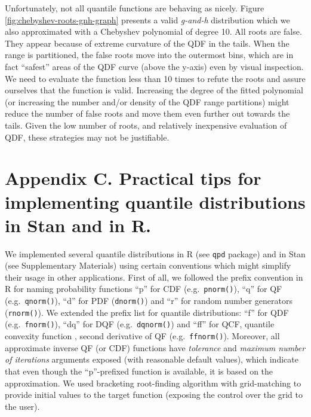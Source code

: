 \documentclass[ba]{imsart}
\numberwithin{equation}{section}
\theoremstyle{plain}
\begin{document}
Unfortunately, not all quantile functions are behaving as nicely. Figure \ref{fig:chebyshev-roots-gnh-graph} presents a valid \emph{g-and-h} distribution which we also approximated with a Chebyshev polynomial of degree 10. All roots are false. They appear because of extreme curvature of the QDF in the tails. When the range is partitioned, the false roots move into the outermost bins, which are in fact ``safest'' areas of the QDF curve (above the y-axis) even by visual inspection. We need to evaluate the function less than 10 times to refute the roots and assure ourselves that the function is valid. Increasing the degree of the fitted polynomial (or increasing the number and/or density of the QDF range partitions) might reduce the number of false roots and move them even further out towards the tails. Given the low number of roots, and relatively inexpensive evaluation of QDF, these strategies may not be justifiable.

\hypertarget{appendix-c.-practical-tips-for-implementing-quantile-distributions-in-stan-and-in-r.}{%
\section*{Appendix C. Practical tips for implementing quantile distributions in Stan and in R.}\label{appendix-c.-practical-tips-for-implementing-quantile-distributions-in-stan-and-in-r.}}

We implemented several quantile distributions in R (see \texttt{qpd} package) and in Stan (see Supplementary Materials) using certain conventions which might simplify their usage in other applications. First of all, we followed the prefix convention in R for naming probability functions ``p'' for CDF (e.g.~\texttt{pnorm()}), ``q'' for QF (e.g.~\texttt{qnorm()}), ``d'' for PDF (\texttt{dnorm()}) and ``r'' for random number generators (\texttt{rnorm()}). We extended the prefix list for quantile distributions: ``f'' for QDF (e.g.~\texttt{fnorm()}), ``dq'' for DQF (e.g.~\texttt{dqnorm()}) and ``ff'' for QCF, quantile convexity function , second derivative of QF (e.g.~\texttt{ffnorm()}). Moreover, all approximate inverse QF (or CDF) functions have \emph{tolerance} and \emph{maximum number of iterations} arguments exposed (with reasonable default values), which indicate that even though the ``p''-prefixed function is available, it is based on the approximation. We used bracketing root-finding algorithm with grid-matching to provide initial values to the target function (exposing the control over the grid to the user).
\end{document}
